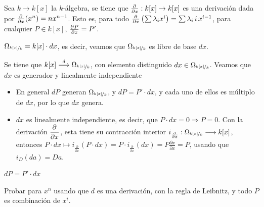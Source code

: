 \begin{ejem}
    Sea $k \to k[x]$ la $k$-\'algebra, se tiene que $\frac{\partial^{} }{\partial x} : k[x] \to k[x]$ es una derivaci\'on dada por $\frac{\partial^{} }{\partial x}(x^n) = n x^{n-1}$. Esto es, para todo $\frac{\partial^{} }{\partial x} \left(\sum \lambda_i x^i \right) = \sum \lambda_i \, i\, x^{i-1}$, para cualquier $P \in k[x]$, $\frac{\partial^{} P}{\partial x} = P'$. 
\end{ejem}
\begin{prop}
    $\Omega_{\nicefrac{k[x]}{k}} = k[x] \cdot dx$, es decir, veamos que $\Omega_{\nicefrac{k[x]}{k}}$ es libre de base $dx$.
\end{prop}
\begin{dem}    
    Se tiene que $k[x] \overset{d}{\longrightarrow} \Omega_{\nicefrac{k[x]}{k}}$, con elemento distinguido $dx \in \Omega_{\nicefrac{k[x]}{k}}$. Veamos que $dx$ es generador y linealmente independiente
    \begin{itemize}
        \item En general $dP$ generan $\Omega_{\nicefrac{k[x]}{k}}$, y $dP = P'\cdot dx$, y cada uno de ellos es m\'ultiplo de $dx$, por lo que $dx$ genera. 
        \item $dx$ es linealmente independiente, es decir, que $P\cdot dx = 0\Rightarrow P =0 $. Con la derivaci\'on $\dfrac{\partial^{} }{\partial x}$, esta tiene su contracci\'on interior $i_{\frac{\partial}{\partial x}} : \Omega_{\nicefrac{k[x]}{k}} \longrightarrow k[x]$, entonces $P\cdot dx \longmapsto i_{\frac{\partial}{\partial x}}(P \cdot dx) = P\cdot i_{\frac{\partial}{\partial x}} (dx) = P \frac{\partial x}{\partial x} = P$, usando que $i_D(da) = Da$. 
    \end{itemize}
\end{dem}
\begin{lem}
    $dP = P' \cdot dx$
\end{lem}
\begin{dem}
    Probar para $x^{n}$ usando que $d$ es una derivaci\'on, con la regla de Leibnitz, y todo $P$ es combinaci\'on de $x^i$.
\end{dem}

